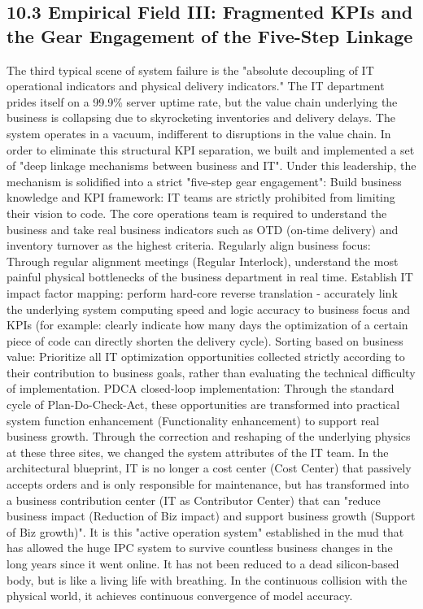 \documentclass[11pt,a4paper]{article}
\begin{document}
\subsection*{10.3 Empirical Field III: Fragmented KPIs and the Gear Engagement of the Five-Step Linkage}


The third typical scene of system failure is the "absolute decoupling of IT operational indicators and physical delivery indicators." The IT department prides itself on a 99.9\% server uptime rate, but the value chain underlying the business is collapsing due to skyrocketing inventories and delivery delays. The system operates in a vacuum, indifferent to disruptions in the value chain. In order to eliminate this structural KPI separation, we built and implemented a set of "deep linkage mechanisms between business and IT". Under this leadership, the mechanism is solidified into a strict "five-step gear engagement": Build business knowledge and KPI framework: IT teams are strictly prohibited from limiting their vision to code. The core operations team is required to understand the business and take real business indicators such as OTD (on-time delivery) and inventory turnover as the highest criteria. Regularly align business focus: Through regular alignment meetings (Regular Interlock), understand the most painful physical bottlenecks of the business department in real time. Establish IT impact factor mapping: perform hard-core reverse translation - accurately link the underlying system computing speed and logic accuracy to business focus and KPIs (for example: clearly indicate how many days the optimization of a certain piece of code can directly shorten the delivery cycle). Sorting based on business value: Prioritize all IT optimization opportunities collected strictly according to their contribution to business goals, rather than evaluating the technical difficulty of implementation. PDCA closed-loop implementation: Through the standard cycle of Plan-Do-Check-Act, these opportunities are transformed into practical system function enhancement (Functionality enhancement) to support real business growth. Through the correction and reshaping of the underlying physics at these three sites, we changed the system attributes of the IT team. In the architectural blueprint, IT is no longer a cost center (Cost Center) that passively accepts orders and is only responsible for maintenance, but has transformed into a business contribution center (IT as Contributor Center) that can "reduce business impact (Reduction of Biz impact) and support business growth (Support of Biz growth)". It is this "active operation system" established in the mud that has allowed the huge IPC system to survive countless business changes in the long years since it went online. It has not been reduced to a dead silicon-based body, but is like a living life with breathing. In the continuous collision with the physical world, it achieves continuous convergence of model accuracy.
\end{document}
